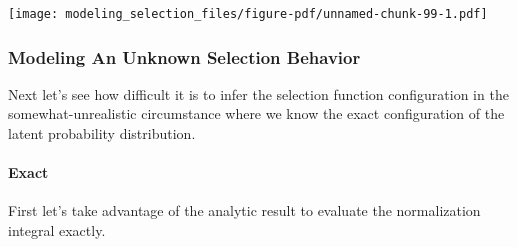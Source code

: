 \documentclass[
  letterpaper,
  DIV=11,
  numbers=noendperiod]{scrartcl}
\let\oldparagraph\paragraph
\renewcommand{\paragraph}[1]{\oldparagraph{#1}\mbox{}}
\begin{document}
\texttt{[image: modeling\_selection\_files/figure-pdf/unnamed-chunk-99-1.pdf]}

\subsubsection{Modeling An Unknown Selection
Behavior}\label{modeling-an-unknown-selection-behavior-1}

Next let's see how difficult it is to infer the selection function
configuration in the somewhat-unrealistic circumstance where we know the
exact configuration of the latent probability distribution.

\paragraph{Exact}\label{exact-2}

First let's take advantage of the analytic result to evaluate the
normalization integral exactly.
\end{document}
